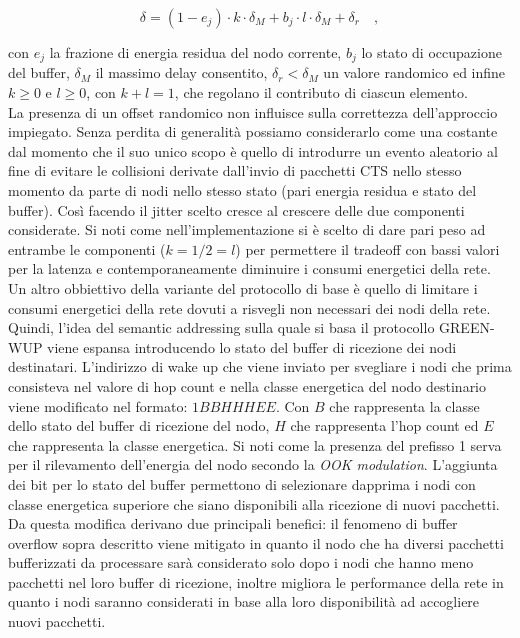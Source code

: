 \documentclass{report}
\begin{document}
$$ \delta= (1-e_{j}) \cdot k \cdot \delta_{M} + b_{j} \cdot l \cdot \delta_{M} + \delta_{r} \quad ,$$

con $e_{j}$ la frazione di energia residua del nodo corrente, $b_{j}$ lo stato di occupazione del buffer, $\delta_{M}$ il massimo delay consentito,
$\delta_{r} < \delta_{M}$ un valore randomico ed infine $k \geq 0$ e $l \geq 0$, con $k+l=1$, che regolano il contributo di ciascun elemento.\\

La presenza di un offset randomico non influisce sulla correttezza dell'approccio impiegato. Senza perdita di generalità possiamo considerarlo come una
costante dal momento che il suo unico scopo è quello di introdurre un evento aleatorio al fine di evitare le collisioni derivate dall'invio di pacchetti CTS
nello stesso momento da parte di nodi nello stesso stato (pari energia residua e stato del buffer). Così facendo il jitter scelto cresce al crescere
delle due componenti considerate. Si noti come nell'implementazione si è scelto di dare pari peso ad entrambe le componenti ($k=1/2=l$) per permettere il
tradeoff con bassi valori per la latenza e contemporaneamente diminuire i consumi energetici della rete.\\

Un altro obbiettivo della variante del protocollo di base è quello di limitare i consumi energetici della rete dovuti a risvegli non necessari dei nodi
della rete. Quindi, l'idea del semantic addressing sulla quale si basa il protocollo GREEN-WUP viene espansa introducendo lo stato del buffer di ricezione dei nodi
destinatari. L'indirizzo di wake up che viene inviato per svegliare i nodi che prima consisteva nel valore di hop count e nella classe energetica del nodo destinario
viene modificato nel formato: $1BBHHHEE$. Con $B$ che rappresenta la classe dello stato del buffer di ricezione del nodo, $H$ che rappresenta l'hop count ed
$E$ che rappresenta la classe energetica. Si noti come la presenza del prefisso 1 serva per il rilevamento dell'energia del nodo secondo la \emph{OOK modulation}.
L'aggiunta dei bit per lo stato del buffer permettono di selezionare dapprima i nodi con classe energetica superiore che siano disponibili alla ricezione
di nuovi pacchetti. Da questa modifica derivano due principali benefici: il fenomeno di buffer overflow sopra descritto viene mitigato in quanto il nodo
che ha diversi pacchetti bufferizzati da processare sarà considerato solo dopo i nodi che hanno meno pacchetti nel loro buffer di ricezione, inoltre migliora
le performance della rete in quanto i nodi saranno considerati in base alla loro disponibilità ad accogliere nuovi pacchetti.\\
\end{document}
